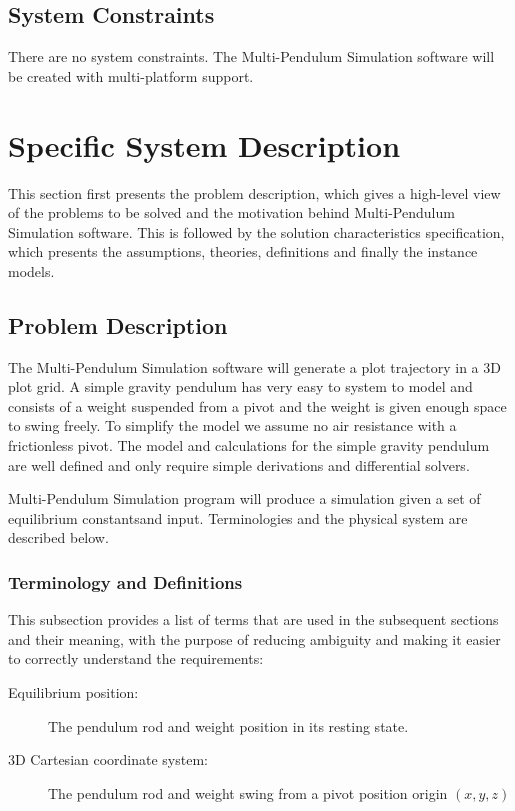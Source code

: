 \documentclass[12pt]{article}
\newcommand{\progname}{Multi-Pendulum Simulation }
\begin{document}
\subsection{System Constraints}
There are no system constraints. The \progname software will be created with
multi-platform support.

\newpage
\section{Specific System Description}

This section first presents the problem description, which gives a high-level
view of the problems to be solved and the motivation behind \progname software.
This is followed by the solution
characteristics specification, which presents the assumptions, theories, 
definitions and finally the instance models.

\subsection{Problem Description}

The \progname software will generate a plot trajectory in a 3D plot grid.
A simple gravity pendulum has very easy to system to model and consists of a
weight suspended from a pivot and the weight is given enough space to swing
freely. To simplify the model we assume no air resistance with a frictionless
pivot. The model and calculations for the simple gravity pendulum are well
defined and only require simple derivations and differential solvers.

\progname program will produce a simulation given a set of equilibrium constantsand input.
Terminologies and the physical system are described below.

\subsubsection{Terminology and Definitions}

This subsection provides a list of terms that are used in the subsequent
sections and their meaning, with the purpose of reducing ambiguity and making
it easier to correctly understand the requirements:

\begin{description}
\item[Equilibrium position:] The pendulum rod and weight position in its resting state.
\item[3D Cartesian coordinate system:] The pendulum rod and weight swing from a
pivot position origin $(x,y,z)$
\end{description}
\end{document}

